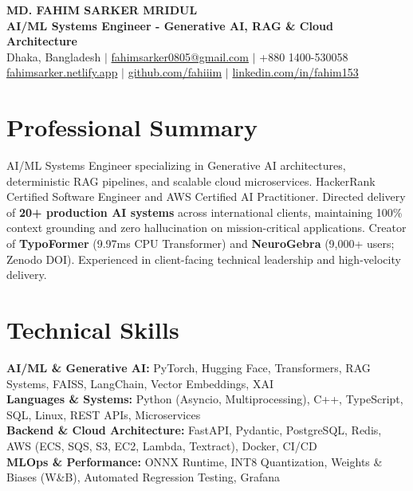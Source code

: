 \documentclass[9.5pt,a4paper]{article}
\begin{document}
{\centering
    {\Large \textbf{MD. FAHIM SARKER MRIDUL}}\\[1pt]
    \textbf{AI/ML Systems Engineer - Generative AI, RAG \& Cloud Architecture}\\[1pt]
    Dhaka, Bangladesh \;$\vert$\; \href{mailto:fahimsarker0805@gmail.com}{fahimsarker0805@gmail.com} \;$\vert$\; +880 1400-530058\\[1pt]
    \href{https://fahimsarker.netlify.app}{fahimsarker.netlify.app} \;$\vert$\; \href{https://github.com/fahiiim}{github.com/fahiiim} \;$\vert$\; \href{https://linkedin.com/in/fahim153}{linkedin.com/in/fahim153}\par
}

\vspace{-2.5pt}
\section*{Professional Summary}
AI/ML Systems Engineer specializing in Generative AI architectures, deterministic RAG pipelines, and scalable cloud microservices. HackerRank Certified Software Engineer and AWS Certified AI Practitioner. Directed delivery of \textbf{20+ production AI systems} across international clients, maintaining 100\% context grounding and zero hallucination on mission-critical applications. Creator of \textbf{TypoFormer} (9.97ms CPU Transformer) and \textbf{NeuroGebra} (9,000+ users; Zenodo DOI). Experienced in client-facing technical leadership and high-velocity delivery.

\section*{Technical Skills}
\noindent
\textbf{AI/ML \& Generative AI:} PyTorch, Hugging Face, Transformers, RAG Systems, FAISS, LangChain, Vector Embeddings, XAI\\
\textbf{Languages \& Systems:} Python (Asyncio, Multiprocessing), C++, TypeScript, SQL, Linux, REST APIs, Microservices\\
\textbf{Backend \& Cloud Architecture:} FastAPI, Pydantic, PostgreSQL, Redis, AWS (ECS, SQS, S3, EC2, Lambda, Textract), Docker, CI/CD\\
\textbf{MLOps \& Performance:} ONNX Runtime, INT8 Quantization, Weights \& Biases (W\&B), Automated Regression Testing, Grafana
\end{document}
